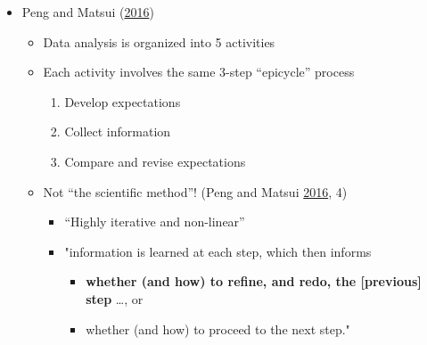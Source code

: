 \documentclass[
]{article}
\providecommand{\tightlist}{%
  \setlength{\itemsep}{0pt}\setlength{\parskip}{0pt}}
\begin{document}
\begin{itemize}
\tightlist
\item
  Peng and Matsui (\protect\hyperlink{ref-PengArtDataScience2016}{2016})

  \begin{itemize}
  \tightlist
  \item
    Data analysis is organized into 5 activities
  \item
    Each activity involves the same 3-step ``epicycle'' process

    \begin{enumerate}
    \def\labelenumi{\arabic{enumi}.}
    \tightlist
    \item
      Develop expectations
    \item
      Collect information
    \item
      Compare and revise expectations
    \end{enumerate}
  \item
    Not ``the scientific method''! (Peng and Matsui \protect\hyperlink{ref-PengArtDataScience2016}{2016}, 4)

    \begin{itemize}
    \tightlist
    \item
      ``Highly iterative and non-linear''
    \item
      "information is learned at each step, which then informs

      \begin{itemize}
      \tightlist
      \item
        \textbf{whether (and how) to refine, and redo, the {[}previous{]} step} \ldots, or
      \item
        whether (and how) to proceed to the next step."
      \end{itemize}
    \end{itemize}
  \end{itemize}
\end{itemize}
\end{document}
